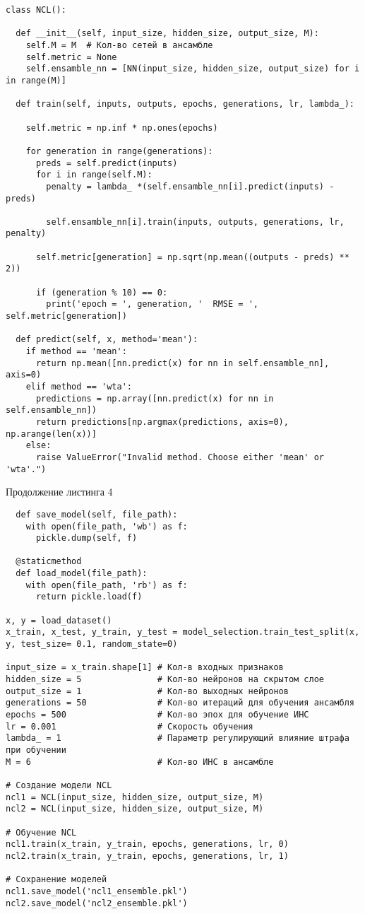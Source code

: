 \documentclass[12pt]{extarticle}
\begin{document}
\begin{lstlisting}
class NCL():

  def __init__(self, input_size, hidden_size, output_size, M):
    self.M = M  # Кол-во сетей в ансамбле
    self.metric = None
    self.ensamble_nn = [NN(input_size, hidden_size, output_size) for i in range(M)]

  def train(self, inputs, outputs, epochs, generations, lr, lambda_):

    self.metric = np.inf * np.ones(epochs)

    for generation in range(generations):
      preds = self.predict(inputs)
      for i in range(self.M):
        penalty = lambda_ *(self.ensamble_nn[i].predict(inputs) - preds)

        self.ensamble_nn[i].train(inputs, outputs, generations, lr, penalty)

      self.metric[generation] = np.sqrt(np.mean((outputs - preds) ** 2))

      if (generation % 10) == 0:
        print('epoch = ', generation, '  RMSE = ', self.metric[generation])

  def predict(self, x, method='mean'):
    if method == 'mean':
      return np.mean([nn.predict(x) for nn in self.ensamble_nn], axis=0)
    elif method == 'wta':
      predictions = np.array([nn.predict(x) for nn in self.ensamble_nn])
      return predictions[np.argmax(predictions, axis=0), np.arange(len(x))]
    else:
      raise ValueError("Invalid method. Choose either 'mean' or 'wta'.")
\end{lstlisting}

\newpage

Продолжение листинга 4

\begin{lstlisting}
  def save_model(self, file_path):
    with open(file_path, 'wb') as f:
      pickle.dump(self, f)

  @staticmethod
  def load_model(file_path):
    with open(file_path, 'rb') as f:
      return pickle.load(f)

x, y = load_dataset()
x_train, x_test, y_train, y_test = model_selection.train_test_split(x, y, test_size= 0.1, random_state=0)

input_size = x_train.shape[1] # Кол-в входных признаков
hidden_size = 5               # Кол-во нейронов на скрытом слое
output_size = 1               # Кол-во выходных нейронов
generations = 50              # Кол-во итераций для обучения ансамбля
epochs = 500                  # Кол-во эпох для обучение ИНС
lr = 0.001                    # Скорость обучения
lambda_ = 1                   # Параметр регулирующий влияние штрафа при обучении
M = 6                         # Кол-во ИНС в ансамбле

# Создание модели NCL
ncl1 = NCL(input_size, hidden_size, output_size, M)
ncl2 = NCL(input_size, hidden_size, output_size, M)

# Обучение NCL
ncl1.train(x_train, y_train, epochs, generations, lr, 0)
ncl2.train(x_train, y_train, epochs, generations, lr, 1)

# Сохранение моделей
ncl1.save_model('ncl1_ensemble.pkl')
ncl2.save_model('ncl2_ensemble.pkl')
\end{lstlisting}
\end{document}

